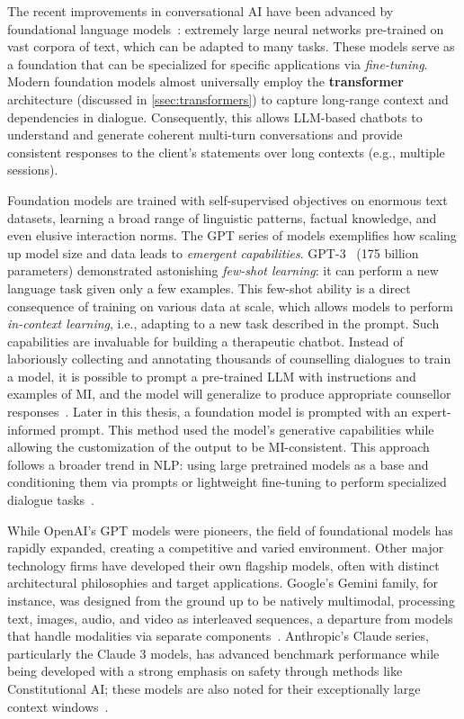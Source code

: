 The recent improvements in conversational AI have been advanced by foundational language models~\cite{stanfordCRFM2021}: extremely large neural networks pre-trained on vast corpora of text, which can be adapted to many tasks. These models serve as a foundation that can be specialized for specific applications via \emph{fine-tuning}. Modern foundation models almost universally employ the \textbf{transformer} architecture (discussed in \cref{ssec:transformers}) to capture long-range context and dependencies in dialogue. Consequently, this allows LLM-based chatbots to understand and generate coherent multi-turn conversations and provide consistent responses to the client's statements over long contexts (e.g., multiple sessions).

Foundation models are trained with self-supervised objectives on enormous text datasets, learning a broad range of linguistic patterns, factual knowledge, and even elusive interaction norms. The GPT series of models exemplifies how scaling up model size and data leads to \emph{emergent capabilities}. GPT-3~\cite{brown2020language} (175 billion parameters) demonstrated astonishing \emph{few-shot learning}: it can perform a new language task given only a few examples. This few-shot ability is a direct consequence of training on various data at scale, which allows models to perform \emph{in-context learning}, i.e., adapting to a new task described in the prompt. Such capabilities are invaluable for building a therapeutic chatbot. Instead of laboriously collecting and annotating thousands of counselling dialogues to train a model, it is possible to prompt a pre-trained LLM with instructions and examples of MI, and the model will generalize to produce appropriate counsellor responses~\cite{xie-etal-2024-shot-dialogue}. Later in this thesis, a foundation model is prompted with an expert-informed prompt. This method used the model's generative capabilities while allowing the customization of the output to be MI-consistent. This approach follows a broader trend in NLP: using large pretrained models as a base and conditioning them via prompts or lightweight fine-tuning to perform specialized dialogue tasks~\cite{10.5555/3600270.3602070}.

While OpenAI's GPT models were pioneers, the field of foundational models has rapidly expanded, creating a competitive and varied environment. Other major technology firms have developed their own flagship models, often with distinct architectural philosophies and target applications. Google's Gemini family, for instance, was designed from the ground up to be natively multimodal, processing text, images, audio, and video as interleaved sequences, a departure from models that handle modalities via separate components~\cite{team2023gemini}. Anthropic's Claude series, particularly the Claude 3 models, has advanced benchmark performance while being developed with a strong emphasis on safety through methods like Constitutional AI; these models are also noted for their exceptionally large context windows~\cite{anthropic2024claude}.

